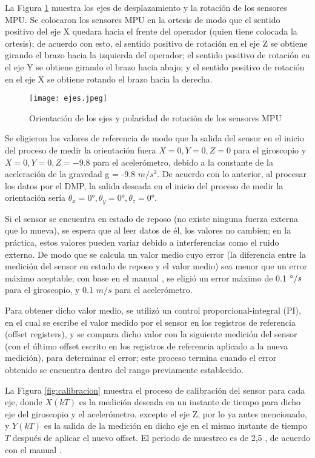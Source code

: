 \newpage
La Figura \ref{fig:ejes} muestra los ejes de desplazamiento y la rotación de los sensores MPU. Se colocaron los sensores MPU en la ortesis de modo que el sentido positivo del eje X quedara hacia el frente del operador (quien tiene colocada la ortesis); de acuerdo con esto, el sentido positivo de rotación en el eje Z se obtiene girando el brazo hacia la izquierda del operador; el sentido positivo de rotación en el eje Y se obtiene girando el brazo hacia abajo; y el sentido positivo de rotación en el eje X se obtiene rotando el brazo hacia la derecha.

\begin{figure}[htb]
	\centering
	\texttt{[image: ejes.jpeg]}
	\caption{Orientación de los ejes y polaridad de rotación de los sensores MPU}
	\label{fig:ejes}
\end{figure}

Se eligieron los valores de referencia de modo que la salida del sensor en el inicio del proceso de medir la orientación fuera $X=0, Y=0, Z=0$ para el giroscopio y $X=0, Y=0, Z=-9.8$ para el acelerómetro, debido a la constante de la aceleración de la gravedad g = -9.8  $m/s^2$. De acuerdo con lo anterior, al procesar los datos por el DMP, la salida deseada en el inicio del proceso de medir la orientación sería $\theta_x = 0°,\theta_y = 0°,\theta_z = 0°$.

Si el sensor se encuentra en estado de reposo (no existe ninguna fuerza externa que lo mueva), se espera que al leer datos de él, los valores no cambien; en la práctica, estos valores pueden variar debido a interferencias como el ruido externo. De modo que se calcula un valor medio cuyo error (la diferencia entre la medición del sensor en estado de reposo y el valor medio) sea menor que un error máximo aceptable; con base en el manual \cite{offsetMPU}, se eligió un error máximo de 0.1 $\degree/s$ para el giroscopio, y 0.1 $m/s$ para el acelerómetro.

Para obtener dicho valor medio, se utilizó un control proporcional-integral (PI), en el cual se escribe el valor medido por el sensor en los registros de referencia (offset registers), y se compara dicho valor con la siguiente medición del sensor (con el último offset escrito en los registros de referencia aplicado a la nueva medición), para determinar el error; este proceso termina cuando el error obtenido se encuentra dentro del rango previamente establecido.

La Figura \ref{fig:calibracion} muestra el proceso de calibración del sensor para cada eje, donde $X(kT)$  es la medición deseada en un instante de tiempo para dicho eje del giroscopio y el acelerómetro, excepto el eje Z, por lo ya antes mencionado, y $Y(kT)$ es la salida de la medición en dicho eje en el mismo instante de tiempo $T$ después de aplicar el nuevo offset. El periodo de muestreo es de 2,5\mu{} , de acuerdo con el manual \cite{offsetMPU}.

